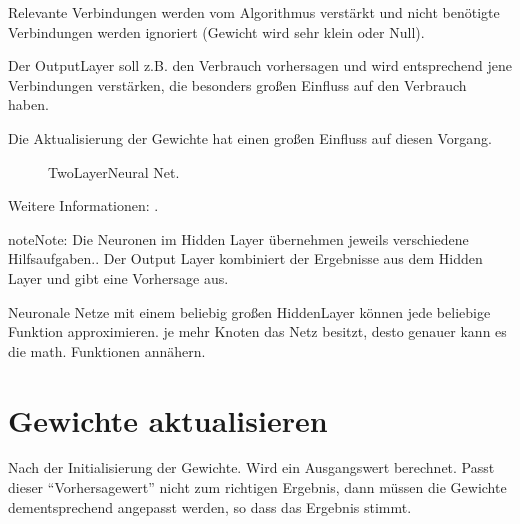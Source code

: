 \documentclass[letterpaper,10pt,english]{jupyterBook}
\let\sphinxpxdimen\pdfpxdimen\else\newdimen\sphinxpxdimen
\begin{document}
\sphinxAtStartPar
Relevante Verbindungen werden vom Algorithmus verstärkt und nicht benötigte Verbindungen werden ignoriert (Gewicht wird sehr klein oder Null).

\sphinxAtStartPar
Der Output\sphinxhyphen{}Layer soll z.B. den Verbrauch vorhersagen und wird entsprechend jene Verbindungen verstärken, die besonders großen Einfluss auf den Verbrauch haben.

\sphinxAtStartPar
Die Aktualisierung der Gewichte hat einen großen Einfluss auf diesen Vorgang.

\begin{figure}[htbp]
\centering
\capstart

\noindent\sphinxincludegraphics[width=1000\sphinxpxdimen]{{hiddenLayer_1}.png}
\caption{Two\sphinxhyphen{}Layer\sphinxhyphen{}Neural Net.}\label{\detokenize{02_NN/NN_learning:two-layer-net}}\end{figure}

\sphinxAtStartPar
Weitere Informationen:
.

\begin{sphinxadmonition}{note}{Note:}
\sphinxAtStartPar
Die Neuronen im Hidden Layer übernehmen jeweils verschiedene Hilfsaufgaben.. Der Output Layer kombiniert der Ergebnisse aus dem Hidden Layer und gibt eine Vorhersage aus.
\end{sphinxadmonition}

\begin{sphinxVerbatim}[commandchars=\\\{\}]
\PYGZhy{} Neuronale Netze mit einem beliebig großen Hidden\PYGZhy{}Layer können jede beliebige Funktion approximieren.
\PYGZhy{} je mehr Knoten das Netz besitzt, desto genauer kann es die math. Funktionen annähern.
\end{sphinxVerbatim}

\begin{sphinxVerbatim}[commandchars=\\\{\}]

\end{sphinxVerbatim}


\section{Gewichte aktualisieren}
\label{\detokenize{02_NN/NN_learning:gewichte-aktualisieren}}
\sphinxAtStartPar
Nach der Initialisierung der Gewichte. Wird ein Ausgangswert berechnet. Passt dieser “Vorhersagewert” nicht zum richtigen Ergebnis, dann müssen die Gewichte dementsprechend angepasst werden, so dass das Ergebnis stimmt.
\end{document}
